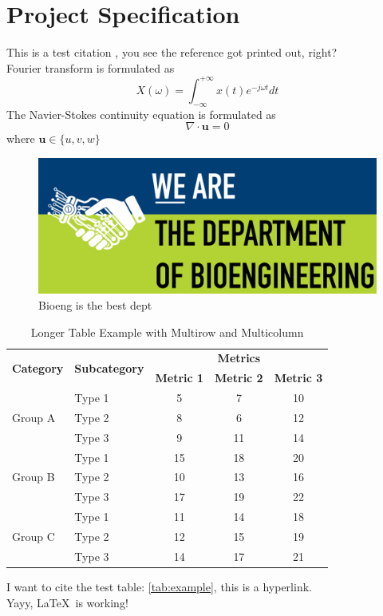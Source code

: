 \newpage

\section{Project Specification}


This is a test citation \cite{oreo}, you see the reference got printed out, right? \\

Fourier transform is formulated as
\[
    X(\omega) = \int_{-\infty}^{+\infty} x(t)e^{-j\omega t} dt
\]
The Navier-Stokes continuity equation is formulated as
\[
    \nabla \cdot \mathbf{u} = 0
\]
where $\mathbf{u} \in \{u, v, w\}$ \\

\begin{figure}[H]
    \centering
    \includegraphics{figures/Bioeng.png}
    \caption{Bioeng is the best dept}
    \label{fig:my_label}
\end{figure}

\begin{table}[h]
\centering
\begin{tabular}{llccc}
\toprule
\multirow{2}{*}{\textbf{Category}} & \multirow{2}{*}{\textbf{Subcategory}} & \multicolumn{3}{c}{\textbf{Metrics}} \\ \cmidrule(lr){3-5}
&& \textbf{Metric 1} & \textbf{Metric 2} & \textbf{Metric 3} \\ \midrule
    \multirow{3}{*}{Group A}
    & Type 1& 5& 7& 10\\
    & Type 2& 8& 6& 12\\
    & Type 3& 9& 11& 14\\ 
    \midrule
    \multirow{3}{*}{Group B}
    & Type 1& 15& 18& 20\\
    & Type 2& 10& 13& 16\\
    & Type 3& 17& 19& 22\\ 
    \midrule
    \multirow{3}{*}{Group C}
    & Type 1& 11& 14& 18\\
    & Type 2& 12& 15& 19\\
    & Type 3& 14& 17& 21\\ 
    \bottomrule
\end{tabular}
\caption{Longer Table Example with Multirow and Multicolumn}
\label{tab:example}
\end{table}

I want to cite the test table: \autoref{tab:example}, this is a hyperlink. \\

Yayy, \LaTeX \ is working!